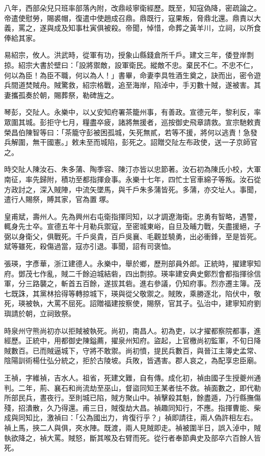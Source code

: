 \begin{pinyinscope}
八年，西部朵兒只班率部落內附，改鼎岐寧衛經歷。既至，知寇偽降，密疏論之。帝遣使慰勞，賜裘帽，復遣中使趙成召鼎。鼎既行，寇果叛，脅鼎北還。鼎責以大義，罵之，遂與成及知事杜寅俱被殺。帝聞，悼惜，命葬之黃羊川，立祠，以所食俸給其家。

易紹宗，攸人。洪武時，從軍有功，授象山縣錢倉所千戶。建文三年，倭登岸剽掠。紹宗大書於壁曰：「設將禦敵，設軍衛民。縱敵不忠。棄民不仁。不忠不仁，何以為臣！為臣不職，何以為人！」書畢，命妻李具牲酒生奠之，訣而出，密令遊兵間道焚賊舟。賊驚救，紹宗格戰，追至海岸，陷淖中，手刃數十賊，遂被害。其妻攜孤奏於朝，賜葬祭，勒碑旌之。

琴彭，交阯人。永樂中，以乂安知府署茶籠州事，有善政。宣德元年，黎利反，率眾圍其城。彭拒守七月，糧盡卒疲，諸將無援者，巡按御史飛章請救。宣宗馳敕責榮昌伯陳智等曰：「茶籠守彭被困孤城，矢死無貳，若等不援，將何以逃責！急發兵解圍，無干國憲。」敕未至而城陷，彭死之。詔贈交阯左布政使，送一子京師官之。

時交阯人陳汝石、朱多蒲、陶季容、陳汀亦皆以忠節著。汝石初為陳氏小校，大軍南征，率先歸附，積功至都指揮僉事。永樂十七年，四忙士官車綿子等叛。汝石從方政討之，深入賊陣，中流矢墜馬，與千戶朱多蒲皆死。多蒲，亦交址人。事聞，遣行人賜祭，賻其家，官為置塚。

皇甫斌，壽州人。先為興州右屯衛指揮同知，以才調遼海衛。忠勇有智略，遇警，輒身先士卒。宣德五年十月勒兵禦寇，至密城東峪，自旦及晡力戰，矢盡援絕，子弼以身衛父，俱戰死。千戶吳貴，百戶吳襄、毛觀並驍勇，出必衝鋒，至是皆死。斌等雖死，殺傷過當，寇亦引退。事聞，詔有司褒恤。

張瑛，字彥華，浙江建德人。永樂中，舉於鄉，歷刑部員外郎。正統時，擢建寧知府。鄧茂七作亂，賊二千餘迫城結砦，四出剽掠。瑛率建安典史鄭烈會都指揮徐信軍，分三路襲之，斬首五百餘，遂拔其砦。進右參議，仍知府事。烈亦遷主簿。茂七既誅，其黨林拾得等轉掠城下，瑛與從父敬禦之。賊敗，乘勝逐北，陷伏中，敬死，瑛被執，大罵不屈死。詔贈福建按察使，賜祭，官其子。弘治中，建寧知府劉璵請於朝，立祠致祭。

時泉州守熊尚初亦以拒賊被執死。尚初，南昌人。初為吏，以才擢都察院都事，進經歷。正統中，用都御史陳鎰薦，擢泉州知府。盜起，上官檄尚初監軍，不旬日降賊數百。已而賊逼城下，守將不敢禦。尚初憤，提民兵數百，與晉江主簿史孟常、陰陽訓術楊仕弘分統之，拒於古陵坡。兵敗，皆遇害。郡人哀之，為配享忠臣廟。

王禎，字維禎，吉水人。祖省，死建文難，自有傳。成化初，禎由國子生授夔州通判。二年，荊、襄石和尚流劫至巫山，督盜同知王某者怯不救。禎面數之，即代勒所部民兵，晝夜行。至則城已陷，賊方聚山中。禎擊殺其魁，餘盡遁，乃行縣撫傷殘，招潰散，久乃得還。甫三日，賊復劫大昌。禎趣同知行，不應。指揮曹能、柴成與同知比，激禎曰：「公為國出力，肯復行乎？」禎即請往，兩人偽許相左右。禎上馬，挾二人與俱，夾水陣。既渡，兩人見賊即走。禎被圍半日，誤入淖中，賊執欲降之，禎大罵。賊怒，斷其喉及右臂而死。從行者奉節典史及部卒六百餘人皆死。


\end{pinyinscope}
